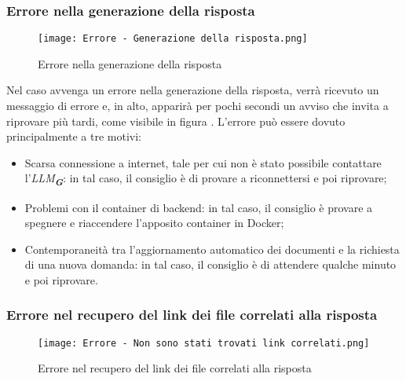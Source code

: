 \subsubsection{Errore nella generazione della risposta}

\begin{figure}[h]
    \centering
        \texttt{[image: Errore - Generazione della risposta.png]}
        \caption{Errore nella generazione della risposta}
        \label{fig:Errore nella generazione della risposta}
\end{figure}

Nel caso avvenga un errore nella generazione della risposta, verrà ricevuto un messaggio di errore e, in alto, apparirà per pochi secondi un avviso che invita a riprovare più tardi, come visibile in figura . L'errore può essere dovuto principalmente a tre motivi:
\begin{itemize}
    \item Scarsa connessione a internet, tale per cui non è stato possibile contattare l'\emph{LLM}\textsubscript{\textbf{\textit{G}}}: in tal caso, il consiglio è di provare a riconnettersi e poi riprovare;
    \item Problemi con il container di backend: in tal caso, il consiglio è provare a spegnere e riaccendere l'apposito container in Docker;
    \item Contemporaneità tra l'aggiornamento automatico dei documenti e la richiesta di una nuova domanda: in tal caso, il consiglio è di attendere qualche minuto e poi riprovare.
\end{itemize}



\subsubsection{Errore nel recupero del link dei file correlati alla risposta}

\begin{figure}[h]
    \centering
        \texttt{[image: Errore - Non sono stati trovati link correlati.png]}
        \caption{Errore nel recupero del link dei file correlati alla risposta}
        \label{fig:Errore nel recupero del link dei file correlati alla risposta}
\end{figure}

